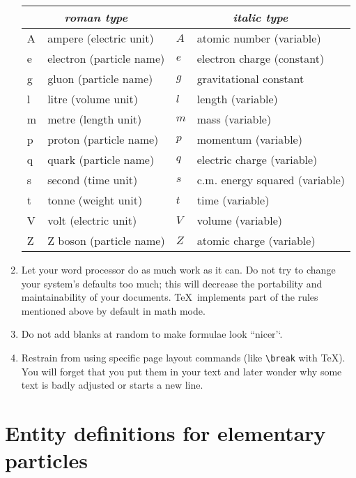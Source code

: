 \documentclass{article}
\begin{document}
\begin{enumerate}
\begin{center}
\begin{tabular}{|lp{45mm}|lp{45mm}|}
\hline
\multicolumn{2}{|c}{\itshape roman type } &
\multicolumn{2}{|c|}{\itshape italic type} \\
\hline
A & ampere (electric unit)      & $A$ & atomic number (variable)       \\
e & electron (particle name)    & $e$ & electron charge (constant)     \\
g & gluon (particle name)       & $g$ & gravitational constant         \\
l & litre (volume unit)         & $l$ & length (variable)              \\
m & metre (length unit)         & $m$ & mass (variable)                \\
p & proton (particle name)      & $p$ & momentum (variable)            \\
q & quark (particle name)       & $q$ & electric charge (variable)     \\
s & second (time unit)          & $s$ & c.m. energy squared (variable) \\
t & tonne (weight unit)         & $t$ & time (variable)                \\
V & volt (electric unit)        & $V$ & volume (variable)              \\
Z & Z boson (particle name)     & $Z$ & atomic charge (variable)       \\
\hline
\end{tabular}
\end{center}
 
\item Let your word processor do as much work as it can. Do not try to
change your system's defaults too much; this will decrease the
portability and maintainability of your documents.
\TeX\ implements part of the rules mentioned above
by default in math mode.
\item Do not add blanks at random to make formulae look ``nicer'`.
\item Restrain from using specific page layout commands (like
\verb+\break+ with \TeX).
You will forget that you put them in your text and later wonder
why some text is badly adjusted or starts a new line.
 
\end{enumerate}
 
 
\section[]{Entity definitions for elementary particles}
 
\end{document}
